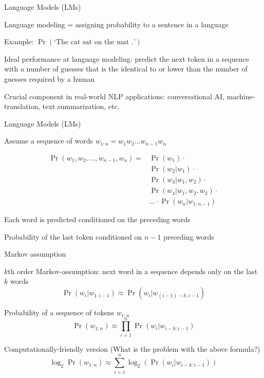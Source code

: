 \documentclass[12pt]{beamer}
\begin{document}
\begin{frame}{Language Models (LMs)}

Language modeling = assigning probability to a sentence in a language

Example: $\Pr(\text{`The cat sat on the mat .'})$

Ideal performance at language modeling: predict the next token in a sequence with a number of guesses that is the identical to or lower than the number of guesses required by a human

Crucial component in real-world NLP applications: conversational AI, machine-translation, text summarization, etc.

\end{frame}
\begin{frame}{Language Models (LMs)}

Assume a sequence of words $w_{1:n} = w_1 w_2 ... w_{n-1} w_n$

$$
\begin{aligned}
\Pr(w_1, w_2, \ldots, w_{n-1}, w_n) = &\Pr(w_1) \cdot \\
& \Pr(w_2|w_1) \cdot \\
& \Pr(w_3|w_1, w_2) \cdot \\
& \Pr(w_4|w_1, w_2, w_3) \cdot \\
& \ldots \cdot \Pr(w_n|w_{1:n-1})
\end{aligned}
$$

Each word is predicted conditioned on the preceding words

Probability of the last token conditioned on $n-1$ preceding words


	
\end{frame}
\begin{frame}{Markov assumption}

$k$th order Markov-assumption: next word in a sequence depends only on the last $k$ words
		\begin{equation*}
		\Pr(w_{i}|w_{1:i-1}) \approx \Pr(w_i | w_{(i-1)-k:i-1})
		\end{equation*}

Probability of a sequence of tokens $w_{1:n}$
		\begin{equation*}
		\Pr(w_{1:n}) \approx \prod_{i=1}^{n} \Pr(w_i | w_{i-k:i-1})
		\end{equation*}

Computationally-friendly version (What is the problem with the above formula?)
\pause
\begin{equation*}
\log_2 \Pr(w_{1:n}) \approx \sum_{i=1}^{n} \log_2 \left( \Pr(w_i | w_{i-k:i-1} )\right)
\end{equation*}


\end{frame}
\end{document}
